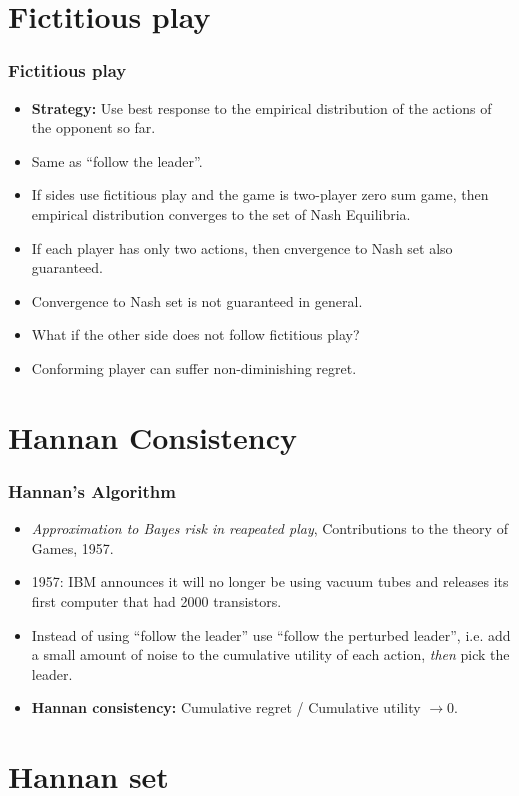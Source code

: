 \documentclass{beamer}
\begin{document}
\section{Fictitious play}

\begin{frame}
\frametitle{Fictitious play}
\begin{itemize}
\item {\bf Strategy:} Use best response to the empirical distribution of
  the actions of the opponent so far.
\item Same as ``follow the leader''.
\item If  sides use fictitious play and the game is two-player
zero sum game, then empirical distribution converges to the set of 
Nash Equilibria.
\item If each player has only two actions, then cnvergence to Nash set
  also guaranteed.
\item Convergence to Nash set is not guaranteed in general.
\item What if the other side does not follow fictitious play?
\item Conforming player can suffer non-diminishing regret.
\end{itemize}
\end{frame}

\section{Hannan Consistency}

\begin{frame}
\frametitle{Hannan's Algorithm}
\begin{itemize}
\item {\em Approximation to Bayes risk in reapeated play}, Contributions
to the theory of Games, 1957.
\item 1957: IBM announces it will no longer be using vacuum tubes and releases its first computer that had 2000 transistors.
\item Instead of using ``follow the leader'' use ``follow the
  perturbed leader'', i.e. add a small amount of noise to the
  cumulative utility of each action, {\em then} pick the leader.
\item {\bf Hannan consistency:} Cumulative regret / Cumulative utility $\to 0$.
\end{itemize}
\end{frame}

\section{Hannan set}
\end{document}
